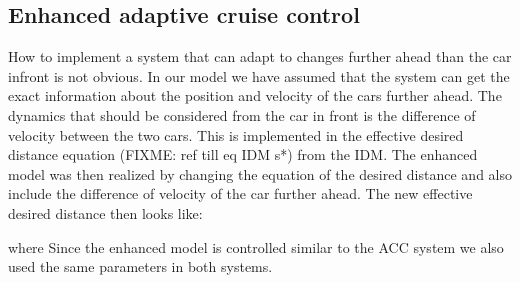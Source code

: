 \subsection {Enhanced adaptive cruise control}
How to implement a system that can adapt to changes further ahead than the car infront is not obvious. In our model we have assumed that the system can get the exact information about the position and velocity of the cars further ahead.
The dynamics that should be considered from the car in front is the difference of velocity between the two cars. This is implemented in the effective desired distance equation (FIXME: ref till eq IDM s*) from the IDM. The enhanced model was then realized by changing the equation of the desired distance and also include the difference of velocity of the car further ahead. The new effective desired distance then looks like:


where %
Since the enhanced model is controlled similar to the ACC system we also used the same parameters in both systems. 

